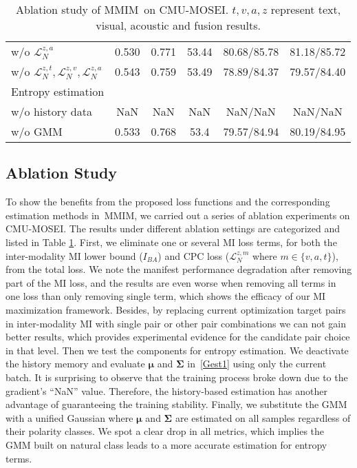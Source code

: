 \documentclass[11pt]{article}
\newcommand{\modelname}{MMIM}
\begin{document}
\begin{table}[th]
{\begin{tabular}{l|c c c c c}
        \quad w/o $\mathcal{L}_N^{z,a}$ & 0.530 & 0.771 & 53.44 & 80.68/85.78 &  81.18/85.72 \\
        \quad w/o $\mathcal{L}_N^{z,t},\mathcal{L}_N^{z,v},\mathcal{L}_N^{z,a}$ & 0.543 & 0.759 & 53.49 & 78.89/84.37 & 79.57/84.40 \\
        Entropy estimation \\
        \quad w/o history data & NaN & NaN & NaN & NaN/NaN & NaN/NaN  \\
        \quad w/o GMM & 0.533 & 0.768 & 53.4 & 79.57/84.94 & 80.19/84.95  \\
        \bottomrule
\end{tabular}
     }
    \caption{Ablation study of \modelname~on CMU-MOSEI. $t,v,a,z$ represent text, visual, acoustic and fusion results.}
    \label{Abl Study}
\end{table}
%
 \subsection{Ablation Study} \label{ABLS}
To show the benefits from the proposed loss functions and the corresponding estimation methods in~\modelname, we carried out a series of ablation experiments on CMU-MOSEI. 
The results under different ablation settings are categorized and listed in Table \ref{Abl Study}.
First, we eliminate one or several MI loss terms, for both the inter-modality MI lower bound ($I_{BA}$) and 
CPC loss ($\mathcal{L}^{z,m}_{N}$ where $m \in \{v,a,t\}$), from the total loss. 
We note the manifest performance degradation after removing part of the MI loss, and the results are even worse when removing all terms in one loss than only removing single term, which shows the efficacy of our MI maximization framework.
Besides, by replacing current optimization target pairs in inter-modality MI with single pair or other pair combinations we can not gain better results, which provides experimental evidence for the candidate pair choice in that level. 
Then we test the components for entropy estimation. 
We deactivate the history memory and evaluate $\bm{\mu}$ and $\bm{\Sigma}$ in~\eqref{Gest1} using only the current batch. It is surprising to observe that the training process broke down due to the gradient's ``NaN'' value.
Therefore, the history-based estimation has another advantage of guaranteeing the training stability.
Finally, we substitute the GMM with a unified Gaussian where $\bm{\mu}$ and $\bm{\Sigma}$ are estimated on all samples regardless of their polarity classes.
We spot a clear drop in all metrics, which implies the GMM built on natural class leads to a more accurate estimation for entropy terms.
\end{document}
